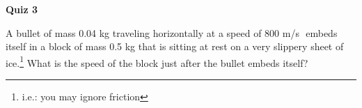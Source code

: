 \documentclass{article}
\begin{document}
\fancyfoot[C]{\thepage}
\vspace*{0cm}
\begin{center}
	{\LARGE \textbf{Quiz 3}}
\end{center}
A bullet of mass 0.04 kg traveling horizontally at a speed of 800 m/s  embeds itself in a block of mass 0.5 kg that is sitting at rest on a very slippery sheet of ice.\footnote{i.e.: you may ignore friction} What is the speed of the block just after the bullet embeds itself?
\end{document}
